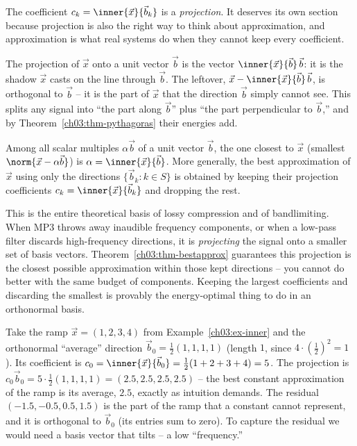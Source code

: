 The coefficient $c_k=\inner{\vec{x}}{\vec{b}_k}$ is a \emph{projection}. It deserves its own
section because projection is also the right way to think about approximation, and approximation is
what real systems do when they cannot keep every coefficient.

The projection of $\vec{x}$ onto a unit vector $\vec{b}$ is the vector
$\inner{\vec{x}}{\vec{b}}\,\vec{b}$: it is the shadow $\vec{x}$ casts on the line through $\vec{b}$.
The leftover, $\vec{x} - \inner{\vec{x}}{\vec{b}}\,\vec{b}$, is orthogonal to $\vec{b}$ -- it is the
part of $\vec{x}$ that the direction $\vec{b}$ simply cannot see. This splits any signal into ``the
part along $\vec{b}$'' plus ``the part perpendicular to $\vec{b}$,'' and by
Theorem~\ref{ch03:thm-pythagoras} their energies add.

\begin{theorem}
\label{ch03:thm-bestapprox}
Among all scalar multiples $\alpha\vec{b}$ of a unit vector $\vec{b}$, the one closest to $\vec{x}$
(smallest $\norm{\vec{x}-\alpha\vec{b}}$) is $\alpha = \inner{\vec{x}}{\vec{b}}$. More generally, the
best approximation of $\vec{x}$ using only the directions $\{\vec{b}_k : k\in S\}$ is obtained by
keeping their projection coefficients $c_k=\inner{\vec{x}}{\vec{b}_k}$ and dropping the rest.
\end{theorem}

\begin{whybox}
This is the entire theoretical basis of lossy compression and of bandlimiting. When MP3 throws away
inaudible frequency components, or when a low-pass filter discards high-frequency directions, it is
\emph{projecting} the signal onto a smaller set of basis vectors. Theorem~\ref{ch03:thm-bestapprox}
guarantees this projection is the closest possible approximation within those kept directions -- you
cannot do better with the same budget of components. Keeping the largest coefficients and discarding
the smallest is provably the energy-optimal thing to do in an orthonormal basis.
\end{whybox}

\begin{example}
\label{ch03:ex-approx}
Take the ramp $\vec{x}=(1,2,3,4)$ from Example~\ref{ch03:ex-inner} and the orthonormal ``average''
direction $\vec{b}_0=\tfrac12(1,1,1,1)$ (length $1$, since $4\cdot(\tfrac12)^2=1$). Its coefficient
is $c_0=\inner{\vec{x}}{\vec{b}_0}=\tfrac12(1+2+3+4)=5$. The projection is
$c_0\vec{b}_0 = 5\cdot\tfrac12(1,1,1,1)=(2.5,2.5,2.5,2.5)$ -- the best constant approximation of the
ramp is its average, $2.5$, exactly as intuition demands. The residual $(-1.5,-0.5,0.5,1.5)$ is the
part of the ramp that a constant cannot represent, and it is orthogonal to $\vec{b}_0$ (its entries
sum to zero). To capture the residual we would need a basis vector that tilts -- a low ``frequency.''
\end{example}

